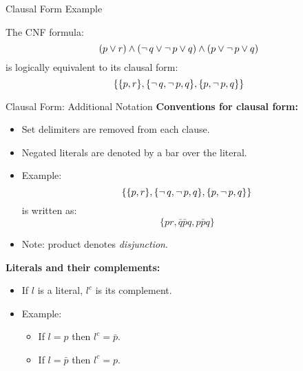 \documentclass[style=sailor,size=12pt]{powerdot}
\begin{document}
\begin{wideslide}[bm=,toc=]{Clausal Form Example}
\begin{ex}{4.7}
The CNF formula:
\[ (p \lor r)\land (\mathop{\neg} q \lor \mathop{\neg} p \lor q) \land (p \lor \mathop{\neg} p \lor q) \] is
logically equivalent to its clausal form:
\[ \{\{p,r\},\{\mathop{\neg} q, \mathop{\neg} p, q\},\{p, \mathop{\neg} p, q\} \} \]
\end{ex}
\end{wideslide}

\begin{wideslide}[bm=,toc=]{Clausal Form: Additional Notation}
\textbf{Conventions for clausal form:}
\begin{itemize}
\item Set delimiters are removed from each clause.
\item Negated literals are denoted by a bar over the literal.
\item Example: \[ \{\{p,r\},\{\mathop{\neg} q, \mathop{\neg} p, q\},\{p, \mathop{\neg} p, q\} \} \] is
written as:
\[\{pr, \bar{q}\bar{p}q, p\bar{p}q \}  \]
\vspace{-5mm}
\item Note: product denotes \emph{disjunction}.
\end{itemize}
\vspace{3mm}
\textbf{Literals and their complements:}
\begin{itemize}
\item If $l$ is a literal, $l^c$ is its complement.
\item Example: 
\begin{itemize}
\item If $l = p$ then $l^c = \bar{p}$. 
\item If $l = \bar{p}$ then $l^c = p$.
\end{itemize}
\end{itemize}
\end{wideslide}
\end{document}

